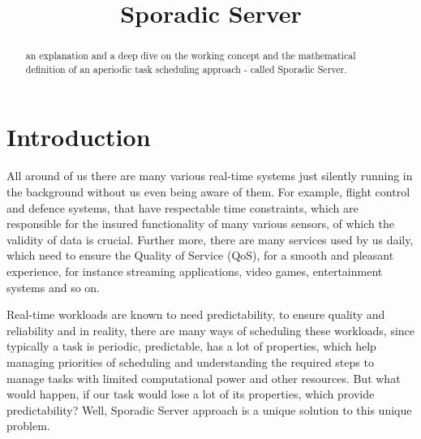 \documentclass[conference]{IEEEtran}
\begin{document}
\title{Sporadic Server}

\author{
}

\maketitle

\begin{abstract}
an explanation and a deep dive on the working concept and the mathematical definition of an aperiodic task scheduling approach - called Sporadic Server. 
\end{abstract}
    


\thispagestyle{firstpagefooter}

\section{Introduction}
All around of us there are many various real-time systems just silently running in the background without us even being aware of them. For example, flight control and defence systems, that have respectable time constraints, which are responsible for the insured functionality of many various sensors, of which the validity of data is crucial. Further more, there are many services used by us daily, which need to ensure the Quality of Service (QoS), for a smooth and pleasant experience, for instance streaming applications, video games, entertainment systems and so on.

Real-time workloads are known to need predictability, to ensure quality and reliability and in reality, there are many ways of scheduling these workloads, since typically a task is periodic, predictable, has a lot of properties, which help managing priorities of scheduling and understanding the required steps to manage tasks with limited computational power and other resources. But what would happen, if our task would lose a lot of its properties, which provide predictability? Well, Sporadic Server approach is a unique solution to this unique problem. 
\end{document}
